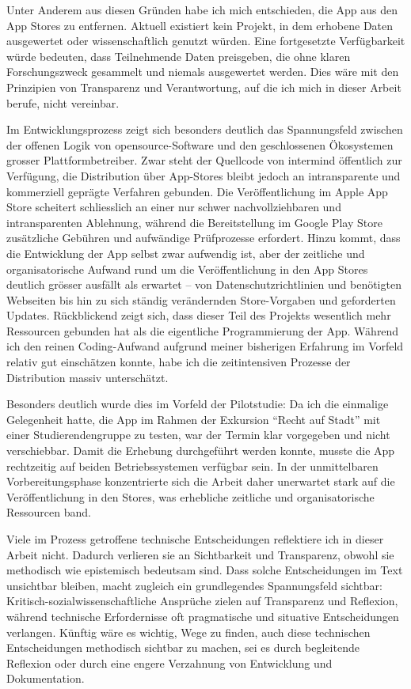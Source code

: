 Unter Anderem aus diesen Gründen habe ich mich entschieden, die App aus den App Stores zu entfernen. Aktuell existiert kein Projekt, in dem erhobene Daten ausgewertet oder wissenschaftlich genutzt würden. Eine fortgesetzte Verfügbarkeit würde bedeuten, dass Teilnehmende Daten preisgeben, die ohne klaren Forschungszweck gesammelt und niemals ausgewertet werden. Dies wäre mit den Prinzipien von Transparenz und Verantwortung, auf die ich mich in dieser Arbeit berufe, nicht vereinbar.

\vspace{1em}

Im Entwicklungsprozess zeigt sich besonders deutlich das Spannungsfeld zwischen der offenen Logik von \gls{opensource}-Software und den geschlossenen Ökosystemen grosser Plattformbetreiber. Zwar steht der Quellcode von \gls{intermind} öffentlich zur Verfügung, die Distribution über App-Stores bleibt jedoch an intransparente und kommerziell geprägte Verfahren gebunden. Die Veröffentlichung im Apple App Store scheitert schliesslich an einer nur schwer nachvollziehbaren und intransparenten Ablehnung, während die Bereitstellung im Google Play Store zusätzliche Gebühren und aufwändige Prüfprozesse erfordert. Hinzu kommt, dass die Entwicklung der App selbst zwar aufwendig ist, aber der zeitliche und organisatorische Aufwand rund um die Veröffentlichung in den App Stores deutlich grösser ausfällt als erwartet -- von Datenschutzrichtlinien und benötigten Webseiten bis hin zu sich ständig verändernden Store-Vorgaben und geforderten Updates. Rückblickend zeigt sich, dass dieser Teil des Projekts wesentlich mehr Ressourcen gebunden hat als die eigentliche Programmierung der App. Während ich den reinen Coding-Aufwand aufgrund meiner bisherigen Erfahrung im Vorfeld relativ gut einschätzen konnte, habe ich die zeitintensiven Prozesse der Distribution massiv unterschätzt.

Besonders deutlich wurde dies im Vorfeld der Pilotstudie: Da ich die einmalige Gelegenheit hatte, die App im Rahmen der Exkursion \enquote{Recht auf Stadt} mit einer Studierendengruppe zu testen, war der Termin klar vorgegeben und nicht verschiebbar. Damit die Erhebung durchgeführt werden konnte, musste die App rechtzeitig auf beiden Betriebssystemen verfügbar sein. In der unmittelbaren Vorbereitungsphase konzentrierte sich die Arbeit daher unerwartet stark auf die Veröffentlichung in den Stores, was erhebliche zeitliche und organisatorische Ressourcen band. 

Viele im Prozess getroffene technische Entscheidungen reflektiere ich in dieser Arbeit nicht. Dadurch verlieren sie an Sichtbarkeit und Transparenz, obwohl sie methodisch wie epistemisch bedeutsam sind. Dass solche Entscheidungen im Text unsichtbar bleiben, macht zugleich ein grundlegendes Spannungsfeld sichtbar: Kritisch-sozialwissenschaftliche Ansprüche zielen auf Transparenz und Reflexion, während technische Erfordernisse oft pragmatische und situative Entscheidungen verlangen. Künftig wäre es wichtig, Wege zu finden, auch diese technischen Entscheidungen methodisch sichtbar zu machen, sei es durch begleitende Reflexion oder durch eine engere Verzahnung von Entwicklung und Dokumentation.

